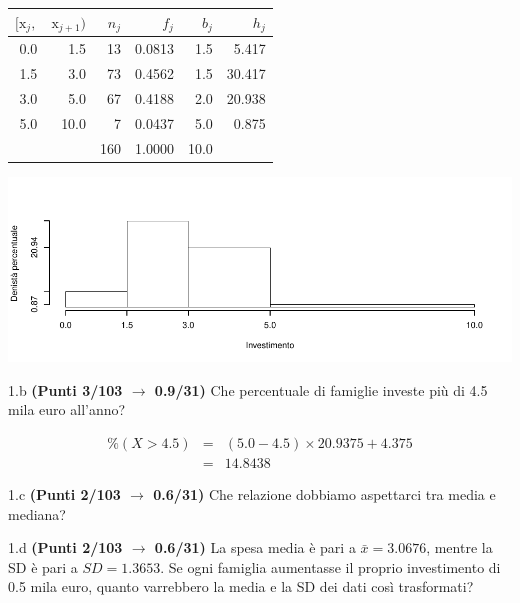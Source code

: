 \documentclass[
  11pt,
]{book}
\theoremstyle{mytheoremstyle}
\theoremstyle{mydefstyle}
\newenvironment{sol}
  {
  \begin{tcolorbox}[enhanced,breakable,arc=0.1mm,boxrule=1pt,colback=white,colframe=iblue,
  title=\bf \fontfamily{lmss}\selectfont \hspace{.5 cm} Soluzione,drop fuzzy shadow]

}{
\end{tcolorbox}
  }
\begin{document}
\begin{sol}

\begin{table}[H]
\centering
\begin{tabular}{rrrrrr}
\toprule
$[\text{x}_j,$ & $\text{x}_{j+1})$ & $n_j$ & $f_j$ & $b_j$ & $h_j$\\
\midrule
0.0 & 1.5 & 13 & 0.0813 & 1.5 & 5.417\\
1.5 & 3.0 & 73 & 0.4562 & 1.5 & 30.417\\
3.0 & 5.0 & 67 & 0.4188 & 2.0 & 20.938\\
5.0 & 10.0 & 7 & 0.0437 & 5.0 & 0.875\\
 &  & 160 & 1.0000 & 10.0 & \\
\bottomrule
\end{tabular}
\end{table}

\begin{center}\includegraphics{Esami_passati_con_soluzioni_files/figure-latex/2023-109-1} \end{center}

\end{sol}

1.b \textbf{(Punti 3/103 \(\rightarrow\) 0.9/31)} Che percentuale di famiglie investe più di 4.5 mila euro all'anno?

\begin{sol}
\begin{eqnarray*}
  \%(X>4.5) &=&  (5.0-4.5)\times20.9375+4.375\\
  &=& 14.8438
\end{eqnarray*}

\end{sol}

1.c \textbf{(Punti 2/103 \(\rightarrow\) 0.6/31)} Che relazione dobbiamo aspettarci tra media e mediana?

1.d \textbf{(Punti 2/103 \(\rightarrow\) 0.6/31)} La spesa media è pari a \(\bar x=3.0676\), mentre la SD è pari a \(SD=1.3653\).
Se ogni famiglia aumentasse il proprio investimento di 0.5 mila euro, quanto varrebbero la media e la SD dei dati così trasformati?
\end{document}

